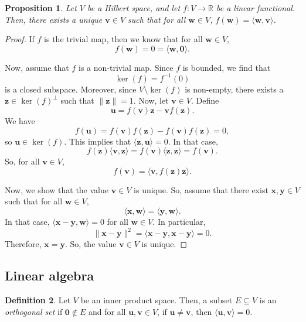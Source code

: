 \documentclass[a4paper, openany]{memoir}
\theoremstyle{definition}
\newtheorem{definition}{Definition}[section]
\theoremstyle{plain}
\newtheorem{proposition}[definition]{Proposition}
\begin{document}
    \begin{proposition}
        Let $V$ be a Hilbert space, and let $f: V \to \mathbb{R}$ be a linear functional. Then, there exists a unique $\bm{v} \in V$ such that for all $\bm{w} \in V$, $f(\bm{w}) = \langle \bm{w}, \bm{v} \rangle$.
    \end{proposition}
    \begin{proof}
        If $f$ is the trivial map, then we know that for all $\bm{w} \in V$,
        \[f(\bm{w}) = 0 = \langle \bm{w}, \bm{0} \rangle.\]

        \noindent Now, assume that $f$ is a non-trivial map. Since $f$ is bounded, we find that
        \[\ker (f) = f^{-1}(0)\]
        is a closed subspace. Moreover, since $V \setminus \ker (f)$ is non-empty, there exists a $\bm{z} \in \ker (f)^\perp$ such that $\lVert \bm{z} \rVert = 1$. Now, let $\bm{v} \in V$. Define
        \[\bm{u} = f(\bm{v}) \bm{z} - \bm{v} f(\bm{z}).\]
        We have
        \[f(\bm{u}) = f(\bm{v}) f(\bm{z}) - f(\bm{v}) f(\bm{z}) = 0,\]
        so $\bm{u} \in \ker (f)$. This implies that $\langle \bm{z}, \bm{u} \rangle = 0$. In that case,
        \[f(\bm{z}) \langle \bm{v}, \bm{z} \rangle = f(\bm{v})\langle \bm{z}, \bm{z} \rangle = f(\bm{v}).\]
        So, for all $\bm{v} \in V$, 
        \[f(\bm{v}) =  \langle \bm{v}, f(\bm{z}) \bm{z} \rangle.\]

        \noindent Now, we show that the value $\bm{v} \in V$ is unique. So, assume that there exist $\bm{x}, \bm{y} \in V$ such that for all $\bm{w} \in V$, 
        \[\langle \bm{x}, \bm{w} \rangle = \langle \bm{y}, \bm{w} \rangle.\]
        In that case, $\langle \bm{x} - \bm{y}, \bm{w}\rangle = 0$ for all $\bm{w} \in V$. In particular, 
        \[\lVert \bm{x} - \bm{y} \rVert^2 = \langle \bm{x} - \bm{y}, \bm{x} - \bm{y} \rangle = 0.\]
        Therefore, $\bm{x} = \bm{y}$. So, the value $\bm{v} \in V$ is unique.
    \end{proof}

    \subsection{Linear algebra}
    \begin{definition}
        Let $V$ be an inner product space. Then, a subset $E \subseteq V$ is an \emph{orthogonal set} if $\bm{0} \not\in E$ and for all $\bm{u}, \bm{v} \in V$, if $\bm{u} \neq \bm{v}$, then $\langle \bm{u}, \bm{v} \rangle = 0$.
    \end{definition}
    
\end{document}
